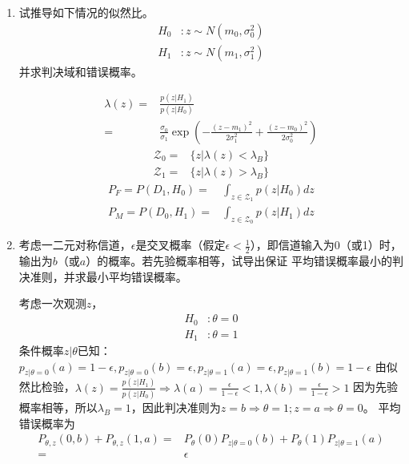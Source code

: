 \documentclass{article}
\begin{document}
\courseheader
{}


\begin{enumerate}
\item 试推导如下情况的似然比。
\begin{align*}
H_0 & :  z\sim N(m_0,\sigma_0^2) \\
H_1 & :  z\sim N(m_1,\sigma_1^2)
\end{align*}
并求判决域和错误概率。
\begin{solution}
\begin{align}
\lambda(z) = & \frac{p(z|H_1)}{p(z|H_0)} \\
            = & \frac{\sigma_0}{\sigma_1}\exp(-\frac{(z-m_1)^2}{2\sigma_1^2}+\frac{(z-m_0)^2}{2\sigma_0^2})\label{eq:Gaussian_likelyhood_ratio}
\end{align}
\begin{align*}
\mathcal{Z}_0 = & \{z|\lambda(z) < \lambda_B\} \\
\mathcal{Z}_1 = & \{z|\lambda(z) > \lambda_B\}
\end{align*}
\begin{align*}
P_F = P(D_1,H_0) = & \int_{z\in \mathcal{Z}_1} p(z|H_0)dz \\
P_M = P(D_0,H_1) = & \int_{z\in \mathcal{Z}_0} p(z|H_1)dz 
\end{align*}
\end{solution}
\item 考虑一二元对称信道，$\epsilon$是交叉概率（假定$\epsilon< \frac{1}{2}$），即信道输入为0（或1）时，输出为$b$（或$a$）的概率。若先验概率相等，试导出保证
平均错误概率最小的判决准则，并求最小平均错误概率。
\begin{solution}
考虑一次观测$z$，
\begin{align*}
H_0 & :  \theta = 0 \\
H_1 & :  \theta = 1
\end{align*}
条件概率$z|\theta$已知：$p_{z|\theta=0}(a)=1-\epsilon,p_{z|\theta=0}(b)=\epsilon,p_{z|\theta=1}(a)=\epsilon,p_{z|\theta=1}(b)=1-\epsilon$
由似然比检验，$\lambda(z)=\frac{p(z|H_1)}{p(z|H_0)}\Rightarrow \lambda(a)=\frac{\epsilon}{1-\epsilon}<1,\lambda(b)=\frac{\epsilon}{1-\epsilon}>1$
因为先验概率相等，所以$\lambda_B=1$，因此判决准则为$z=b \Rightarrow \theta=1; z=a\Rightarrow \theta=0$。
平均错误概率为
\begin{align*}
P_{\theta,z}(0,b)+P_{\theta,z}(1,a)= & P_{\theta}(0) P_{z|\theta=0}(b) + P_{\theta}(1) P_{z|\theta=1}(a) \\
                                 = & \epsilon 
\end{align*}

\end{solution}
\end{enumerate}
\end{document}

